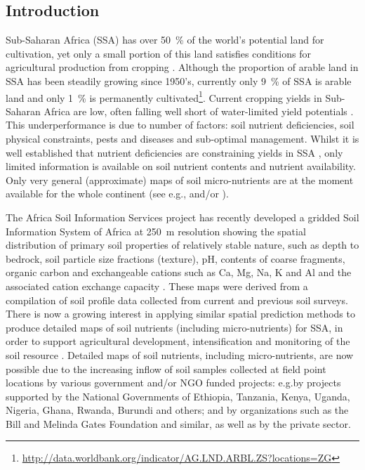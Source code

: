\begin{linenumbers}
\section{Introduction}\label{intro}

Sub-Saharan Africa (SSA) has over \SI{50}{\percent} of the world's potential land for cultivation, yet only a small portion of this land satisfies conditions for agricultural production from cropping \citep{lal1987managing,jayne2010principal}. Although the proportion of arable land in SSA has been steadily growing since 1950's, currently only \SI{9}{\percent} of SSA is arable land and only \SI{1}{\percent} is permanently cultivated\footnote{\url{http://data.worldbank.org/indicator/AG.LND.ARBL.ZS?locations=ZG}}. Current cropping yields in Sub-Saharan Africa are low, often falling well short of water-limited yield potentials \citep{jayne2010principal}. This underperformance is due to number of factors: soil nutrient deficiencies, soil physical constraints, pests and diseases and sub-optimal management. Whilst it is well established that nutrient deficiencies are constraining yields in SSA \citep{giller2009conservation}, only limited information is available on soil nutrient contents and nutrient availability. Only very general (approximate) maps of soil micro-nutrients are at the moment available for the whole continent (see e.g.\@ \citet{Kang1985}, \citet{roy2006plant} and/or \citet{alloway2008micronutrients}).\par 

The Africa Soil Information Services project has recently developed a gridded Soil Information System of Africa at \SI{250}{\metre} resolution showing the spatial distribution of primary soil properties of relatively stable nature, such as depth to bedrock, soil particle size fractions (texture), pH, contents of coarse fragments, organic carbon and exchangeable cations such as Ca, Mg, Na, K and Al and the associated cation exchange capacity \citep{Hengl2015AfSoilGrids250m,Hengl2016SoilGrids250}. These maps were derived from a compilation of soil profile data collected from current and previous soil surveys. There is now a growing interest in applying similar spatial prediction methods to produce detailed maps of soil nutrients (including micro-nutrients) for SSA, in order to support agricultural development, intensification and monitoring of the soil resource \citep{Kamau2012RUFORUM,Shepherd201593,Wild2016Nature}. Detailed maps of soil nutrients, including micro-nutrients, are now possible due to the increasing inflow of soil samples collected at field point locations by various government and/or NGO funded projects: e.g.\@ by projects supported by the National Governments of Ethiopia, Tanzania, Kenya, Uganda, Nigeria, Ghana, Rwanda, Burundi and others; and by organizations such as the Bill and Melinda Gates Foundation \citep{leenaars2012africa,Shepherd201593,towett2015total,vaagen2016mapping} and similar, as well as by the private sector.\par


\end{linenumbers}
